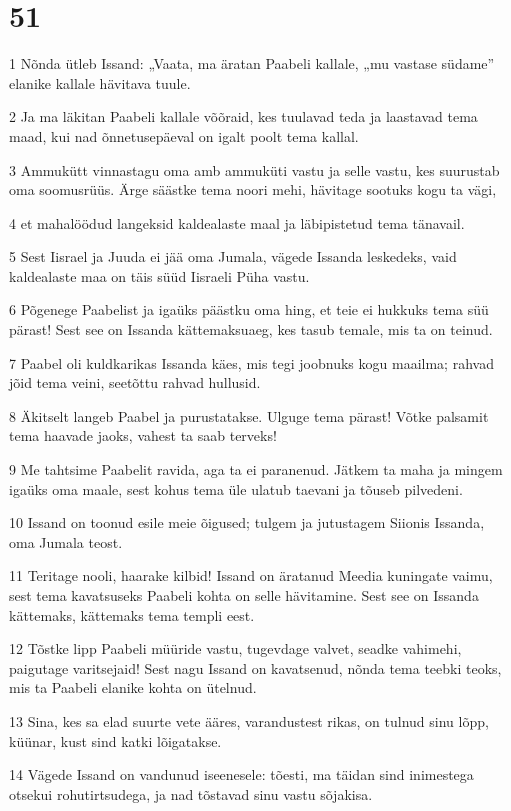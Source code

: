 \chapter{51}

\par 1 Nõnda ütleb Issand: „Vaata, ma äratan Paabeli kallale, „mu vastase südame” elanike kallale hävitava tuule.
\par 2 Ja ma läkitan Paabeli kallale võõraid, kes tuulavad teda ja laastavad tema maad, kui nad õnnetusepäeval on igalt poolt tema kallal.
\par 3 Ammukütt vinnastagu oma amb ammuküti vastu ja selle vastu, kes suurustab oma soomusrüüs. Ärge säästke tema noori mehi, hävitage sootuks kogu ta vägi,
\par 4 et mahalöödud langeksid kaldealaste maal ja läbipistetud tema tänavail.
\par 5 Sest Iisrael ja Juuda ei jää oma Jumala, vägede Issanda leskedeks, vaid kaldealaste maa on täis süüd Iisraeli Püha vastu.
\par 6 Põgenege Paabelist ja igaüks päästku oma hing, et teie ei hukkuks tema süü pärast! Sest see on Issanda kättemaksuaeg, kes tasub temale, mis ta on teinud.
\par 7 Paabel oli kuldkarikas Issanda käes, mis tegi joobnuks kogu maailma; rahvad jõid tema veini, seetõttu rahvad hullusid.
\par 8 Äkitselt langeb Paabel ja purustatakse. Ulguge tema pärast! Võtke palsamit tema haavade jaoks, vahest ta saab terveks!
\par 9 Me tahtsime Paabelit ravida, aga ta ei paranenud. Jätkem ta maha ja mingem igaüks oma maale, sest kohus tema üle ulatub taevani ja tõuseb pilvedeni.
\par 10 Issand on toonud esile meie õigused; tulgem ja jutustagem Siionis Issanda, oma Jumala teost.
\par 11 Teritage nooli, haarake kilbid! Issand on äratanud Meedia kuningate vaimu, sest tema kavatsuseks Paabeli kohta on selle hävitamine. Sest see on Issanda kättemaks, kättemaks tema templi eest.
\par 12 Tõstke lipp Paabeli müüride vastu, tugevdage valvet, seadke vahimehi, paigutage varitsejaid! Sest nagu Issand on kavatsenud, nõnda tema teebki teoks, mis ta Paabeli elanike kohta on ütelnud.
\par 13 Sina, kes sa elad suurte vete ääres, varandustest rikas, on tulnud sinu lõpp, küünar, kust sind katki lõigatakse.
\par 14 Vägede Issand on vandunud iseenesele: tõesti, ma täidan sind inimestega otsekui rohutirtsudega, ja nad tõstavad sinu vastu sõjakisa.
